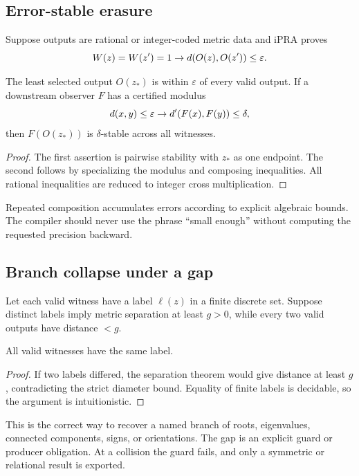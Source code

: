 \subsection{Error-stable erasure}

Suppose outputs are rational or integer-coded metric data and iPRA proves
\[
  W(z)=W(z')=1\rightarrow d(O(z),O(z'))\le\varepsilon.
\]

\begin{theorem}
The least selected output \(O(z_*)\) is within \(\varepsilon\) of every valid
output.  If a downstream observer \(F\) has a certified modulus
\[
  d(x,y)\le\varepsilon\rightarrow
  d'(F(x),F(y))\le\delta,
\]
then \(F(O(z_*))\) is \(\delta\)-stable across all witnesses.
\end{theorem}

\begin{proof}
The first assertion is pairwise stability with \(z_*\) as one endpoint.  The
second follows by specializing the modulus and composing inequalities.
All rational inequalities are reduced to integer cross multiplication.
\end{proof}

Repeated composition accumulates errors according to explicit algebraic
bounds.  The compiler should never use the phrase ``small enough'' without
computing the requested precision backward.

\subsection{Branch collapse under a gap}

Let each valid witness have a label \(\ell(z)\) in a finite discrete set.
Suppose distinct labels imply metric separation at least \(g>0\), while every
two valid outputs have distance \(<g\).

\begin{lemma}
All valid witnesses have the same label.
\end{lemma}

\begin{proof}
If two labels differed, the separation theorem would give distance at least
\(g\), contradicting the strict diameter bound.  Equality of finite labels is
decidable, so the argument is intuitionistic.
\end{proof}

This is the correct way to recover a named branch of roots, eigenvalues,
connected components, signs, or orientations.  The gap is an explicit guard
or producer obligation.  At a collision the guard fails, and only a
symmetric or relational result is exported.

